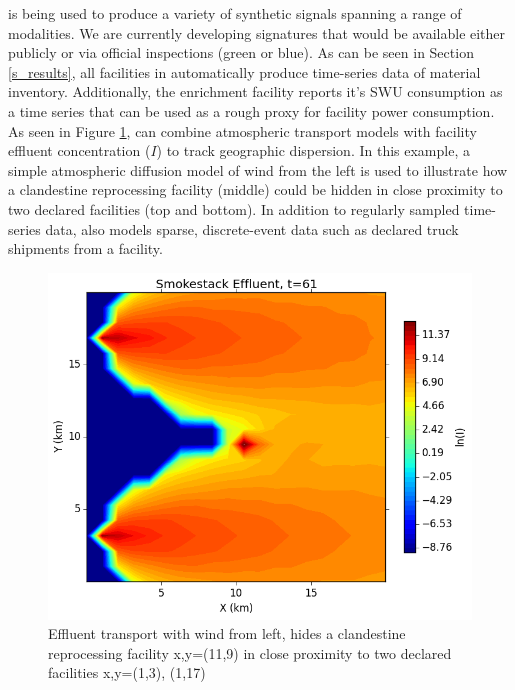 \Cyclus is being used to produce a variety of synthetic signals spanning a range of modalities.  We are currently developing signatures that would be available either publicly or via official inspections (green or blue).  As can be seen in Section \ref{s_results}, all facilities in \Cyclus automatically produce time-series data of material inventory.  Additionally, the enrichment facility reports it's SWU consumption as a time series that can be used as a rough proxy for facility power consumption. As seen in Figure \ref{fig:effluent}, \Cyclus can combine atmospheric transport models with facility effluent concentration ($I$) to track geographic dispersion. In this example, a simple atmospheric diffusion model of wind from the left is used to illustrate how a clandestine reprocessing facility (middle) could be hidden in close proximity to two declared facilities (top and bottom)\cite{hanna_handbook_1982}.  In addition to regularly sampled time-series data, \Cyclus also models sparse, discrete-event data such as declared truck shipments from a facility.


\begin{figure}%
\begin{center}
\includegraphics[natwidth=162bp,natheight=227bp, scale=0.4]{./figs/proper_diff_fr61.png}
\end{center}
\caption{Effluent transport with wind from left, hides a clandestine reprocessing facility x,y=(11,9) in close proximity to two declared facilities x,y=(1,3), (1,17)}
\label{fig:effluent}
\end{figure}

